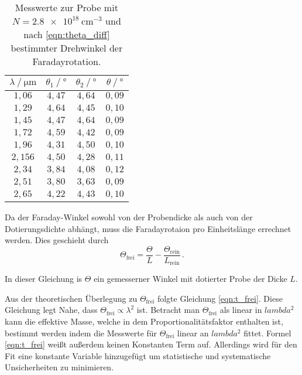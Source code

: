 \begin{table}
              \centering
              \caption{Messwerte zur Probe mit $N = \qty{2.8e18}{\centi\metre^{-3}}$ und nach \autoref{eqn:theta_diff} bestimmter Drehwinkel der Faradayrotation.}
              \label{tab:mw3}
              \begin{tabular}{c c c c}
                \toprule
                $\lambda \mathbin{/} \unit{\micro\meter}$ & $\theta_{1} \mathbin{/} \unit{\degree}$ & $\theta_{2} \mathbin{/} \unit{\degree}$ &%
                 $\theta \mathbin{/} \unit{\degree}$ \\
                \midrule
                $1,06 $ & $4,47$ & $4,64$ & $0,09$ \\
                $1,29 $ & $4,64$ & $4,45$ & $0,10$ \\
                $1,45 $ & $4,47$ & $4,64$ & $0,09$ \\
                $1,72 $ & $4,59$ & $4,42$ & $0,09$ \\
                $1,96 $ & $4,31$ & $4,50$ & $0,10$ \\
                $2,156$ & $4,50$ & $4,28$ & $0,11$ \\
                $2,34 $ & $3,84$ & $4,08$ & $0,12$ \\
                $2,51 $ & $3,80$ & $3,63$ & $0,09$ \\
                $2,65 $ & $4,22$ & $4,43$ & $0,10$ \\
                \bottomrule
              \end{tabular}
\end{table}

Da der Faraday-Winkel sowohl von der Probendicke als auch von der Dotierungsdichte abhängt, muss die Faradayrotaion pro Einheitslänge errechnet werden. Dies geschieht durch 
\begin{equation}
              \Theta_\mathrm{frei} = \frac{\Theta}{L} - \frac{\Theta_\mathrm{rein}}{L_\mathrm{rein}} \,.
\end{equation} 

In dieser Gleichung is $\Theta$ ein gemesserner Winkel mit dotierter Probe der Dicke $L$.

Aus der theoretischen Überlegung zu $\Theta_\mathrm{frei}$ folgte Gleichung \eqref{eqn:t_frei}. Diese Gleichung legt Nahe, dass $\Theta_\mathrm{frei} \propto \lambda^2$ ist. 
Betracht man $\Theta_\mathrm{frei}$ als linear in $lambda^2$ kann die effektive Masse, welche in dem Proportionalitätsfaktor enthalten ist, bestimmt werden indem die Messwerte für 
$\Theta_\mathrm{frei}$ linear an $lambda^2$ fittet. Formel \eqref{eqn:t_frei} weißt außerdem keinen Konstanten Term auf. Allerdings wird für den Fit eine konstante Variable hinzugefügt
um statistische und systematische Unsicherheiten zu minimieren.

